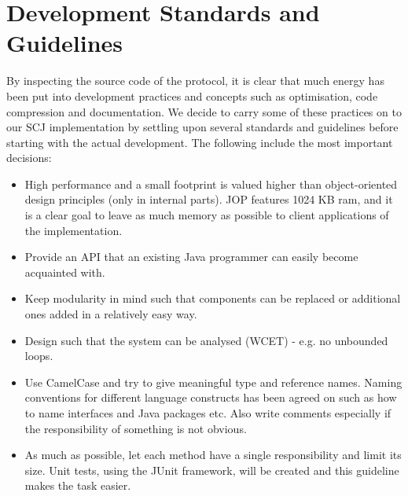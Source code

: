 \section{Development Standards and Guidelines}
\label{sec:stdguid}
By inspecting the source code of the protocol\cite{GomSpace:CSPsrcGit}, it is clear that much energy has been put into development practices and concepts such as optimisation, code compression and documentation. We decide to carry some of these practices on to our SCJ implementation by settling upon several standards and guidelines before starting with the actual development. The following include the most important decisions:

\begin{itemize}
	\item High performance and a small footprint is valued higher than object-oriented design principles (only in internal parts). JOP features 1024 KB ram, and it is a clear goal to leave as much memory as possible to client applications of the implementation.
	\item Provide an API that an existing Java programmer can easily become acquainted with.
	\item Keep modularity in mind such that components can be replaced or additional ones added in a relatively easy way. 
	\item Design such that the system can be analysed (WCET) - e.g. no unbounded loops.
	\item Use CamelCase and try to give meaningful type and reference names. Naming conventions for different language constructs has been agreed on such as how to name interfaces and Java packages etc. Also write comments especially if the responsibility of something is not obvious.
	\item As much as possible, let each method have a single responsibility and limit its size. Unit tests, using the JUnit framework, will be created and this guideline makes the task easier.
\end{itemize}